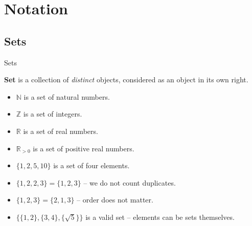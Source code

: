 \documentclass{beamer}
\begin{document}
    \section{Notation}

    \subsection{Sets}

    \begin{frame}{Sets}
      \begin{definition}
        \textbf{Set} is a collection of \textit{distinct} objects, considered as an object in its own right. \pause
      \end{definition}

      \begin{example}
        \begin{itemize}
          \item $\mathbb{N}$ is a set of natural numbers.
          \item $\mathbb{Z}$ is a set of integers.
          \item $\mathbb{R}$ is a set of real numbers.
          \item $\mathbb{R}_{>0}$ is a set of positive real numbers. \pause
          \item $\{1, 2, 5, 10\}$ is a set of four elements.
          \item $\{1, 2, 2, 3\} = \{1,2,3\}$ -- we do not count duplicates. \pause
          \item $\{1,2,3\} = \{2,1,3\}$ -- order does not matter.
          \item $\{\{1,2\},\{3,4\}, \{\sqrt{5}\}\}$ is a valid set -- elements can be sets themselves.
        \end{itemize}
      \end{example}
    \end{frame}
\end{document}
